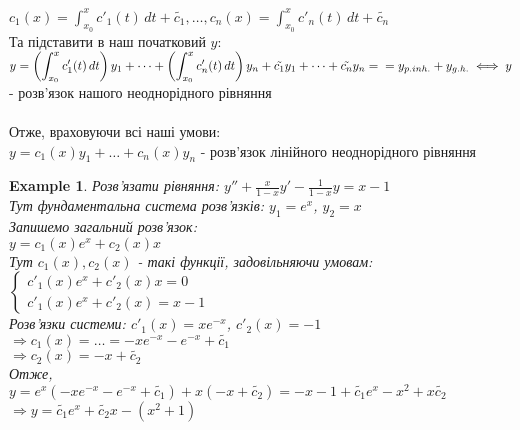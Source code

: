 \documentclass[a4paper, 10pt]{article}
\theoremstyle{theoremdd}
\theoremstyle{theoremdd}
\theoremstyle{theoremdd}
\theoremstyle{theoremdd}
\newtheorem{example}[theorem]{Example}
\theoremstyle{theoremdd}
\theoremstyle{theoremdd}
\theoremstyle{theoremdd}
\theoremstyle{theoremdd}
\begin{document}
$\displaystyle c_1(x) = \int_{x_0}^x c'_1(t)\,dt + \tilde{c_1}, \dots, c_n(x) = \int_{x_0}^x c'_n(t)\,dt + \tilde{c_n}$\\
Та підставити в наш початковий $y$:\\
$\displaystyle y = \left(\int_{x_0}^x c'_1(t)\,dt\right)y_1 + \dots + \left(\int_{x_0}^x c'_n(t)\,dt\right)y_n + \tilde{c_1}y_1 + \dots + \tilde{c_n}y_n = \\ = y_{p.inh.} + y_{g.h.} \iff y$ - розв'язок нашого неоднорідного рівняння\\
\\
Отже, враховуючи всі наші умови:\\ $y = c_1(x)y_1 + \dots + c_n(x)y_n$ - розв'язок лінійного неоднорідного рівняння

\begin{example}
 Розв'язати рівняння: $\displaystyle y'' + \frac{x}{1-x}y' - \frac{1}{1-x}y = x-1$\\
Тут фундаментальна система розв'язків: $y_1 = e^x$, $y_2 = x$\\
Запишемо загальний розв'язок:\\
$y = c_1(x)e^x +c_2(x)x$\\
Тут $c_1(x), c_2(x)$ - такі функції, задовільняючи умовам:\\
$\begin{cases}
c'_1(x)e^x + c'_2(x)x = 0\\
c'_1(x)e^x + c'_2(x) = x-1
\end{cases}$\\
Розв'язки системи: $c'_1(x) = xe^{-x}$, $c'_2(x) = -1$\\
$\Rightarrow c_1(x) = \dots = -xe^{-x} -e^{-x} + \tilde{c_1}$\\
$\Rightarrow c_2(x) = -x + \tilde{c_2}$\\
Отже,\\
$y = e^x(-xe^{-x}-e^{-x}+\tilde{c_1}) + x(-x+\tilde{c_2}) = -x - 1 + \tilde{c_1}e^x - x^2 + x \tilde{c_2}$\\
$\Rightarrow y = \tilde{c_1}e^{x} + \tilde{c_2}x - (x^2 + 1)$
\end{example}
\end{document}
